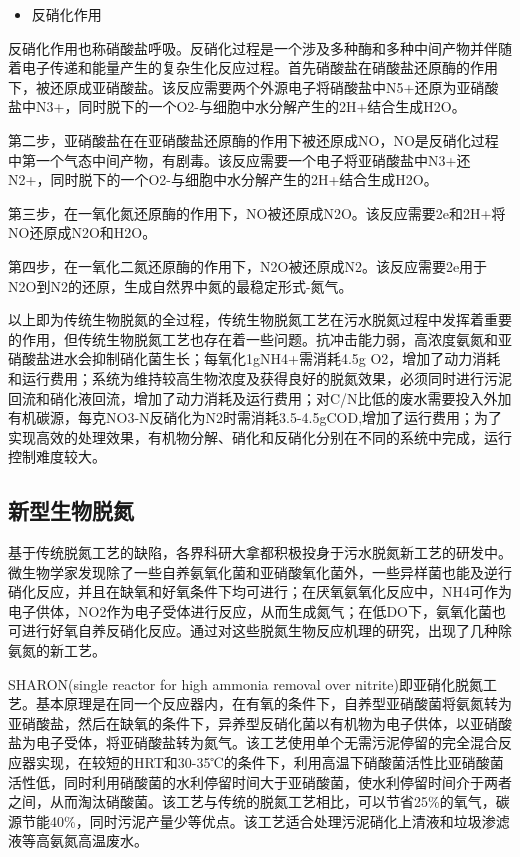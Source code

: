 \documentclass[
]{book}
\providecommand{\tightlist}{%
  \setlength{\itemsep}{0pt}\setlength{\parskip}{0pt}}
\begin{document}
\begin{itemize}
\tightlist
\item
  反硝化作用
\end{itemize}

反硝化作用也称硝酸盐呼吸。反硝化过程是一个涉及多种酶和多种中间产物并伴随着电子传递和能量产生的复杂生化反应过程。首先硝酸盐在硝酸盐还原酶的作用下，被还原成亚硝酸盐。该反应需要两个外源电子将硝酸盐中N5+还原为亚硝酸盐中N3+，同时脱下的一个O2-与细胞中水分解产生的2H+结合生成H2O。

第二步，亚硝酸盐在在亚硝酸盐还原酶的作用下被还原成NO，NO是反硝化过程中第一个气态中间产物，有剧毒。该反应需要一个电子将亚硝酸盐中N3+还N2+，同时脱下的一个O2-与细胞中水分解产生的2H+结合生成H2O。

第三步，在一氧化氮还原酶的作用下，NO被还原成N2O。该反应需要2e和2H+将NO还原成N2O和H2O。

第四步，在一氧化二氮还原酶的作用下，N2O被还原成N2。该反应需要2e用于N2O到N2的还原，生成自然界中氮的最稳定形式-氮气。

以上即为传统生物脱氮的全过程，传统生物脱氮工艺在污水脱氮过程中发挥着重要的作用，但传统生物脱氮工艺也存在着一些问题。抗冲击能力弱，高浓度氨氮和亚硝酸盐进水会抑制硝化菌生长；每氧化1gNH4+需消耗4.5g O2，增加了动力消耗和运行费用；系统为维持较高生物浓度及获得良好的脱氮效果，必须同时进行污泥回流和硝化液回流，增加了动力消耗及运行费用；对C/N比低的废水需要投入外加有机碳源，每克NO3-N反硝化为N2时需消耗3.5-4.5gCOD,增加了运行费用；为了实现高效的处理效果，有机物分解、硝化和反硝化分别在不同的系统中完成，运行控制难度较大。

\hypertarget{ux65b0ux578bux751fux7269ux8131ux6c2e}{%
\subsection{新型生物脱氮}\label{ux65b0ux578bux751fux7269ux8131ux6c2e}}

基于传统脱氮工艺的缺陷，各界科研大拿都积极投身于污水脱氮新工艺的研发中。微生物学家发现除了一些自养氨氧化菌和亚硝酸氧化菌外，一些异样菌也能及逆行硝化反应，并且在缺氧和好氧条件下均可进行；在厌氧氨氧化反应中，NH4可作为电子供体，NO2作为电子受体进行反应，从而生成氮气；在低DO下，氨氧化菌也可进行好氧自养反硝化反应。通过对这些脱氮生物反应机理的研究，出现了几种除氨氮的新工艺。

SHARON(single reactor for high ammonia removal over nitrite)即亚硝化脱氮工艺。基本原理是在同一个反应器内，在有氧的条件下，自养型亚硝酸菌将氨氮转为亚硝酸盐，然后在缺氧的条件下，异养型反硝化菌以有机物为电子供体，以亚硝酸盐为电子受体，将亚硝酸盐转为氮气。该工艺使用单个无需污泥停留的完全混合反应器实现，在较短的HRT和30-35℃的条件下，利用高温下硝酸菌活性比亚硝酸菌活性低，同时利用硝酸菌的水利停留时间大于亚硝酸菌，使水利停留时间介于两者之间，从而淘汰硝酸菌。该工艺与传统的脱氮工艺相比，可以节省25\%的氧气，碳源节能40\%，同时污泥产量少等优点。该工艺适合处理污泥硝化上清液和垃圾渗滤液等高氨氮高温废水。
\end{document}

